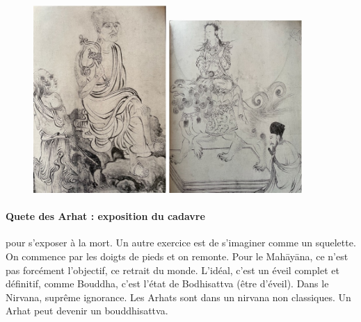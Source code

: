 \begin{figure}
    \centering
    \includegraphics[width=0.45\textwidth]{ConfucianismeTaoismeBouddhismeChinois/Images/Arhat.jpg}
    \includegraphics[width=0.45\textwidth]{ConfucianismeTaoismeBouddhismeChinois/Images/Bodhisattva.jpg}
  
    \label{fig:enter-label}
\end{figure}


\paragraph{Quete des Arhat : exposition du cadavre} pour s'exposer à la mort. Un autre exercice est de s'imaginer comme un squelette. On commence par les doigts de pieds et on remonte. Pour le Mahāyāna, ce n'est pas forcément l'objectif, ce retrait du monde. L'idéal, c'est un éveil complet et définitif, comme Bouddha, c'est l'état de Bodhisattva (être d'éveil). Dans le Nirvana, suprême ignorance. Les Arhats sont dans un nirvana non classiques. Un Arhat peut devenir un bouddhisattva.

